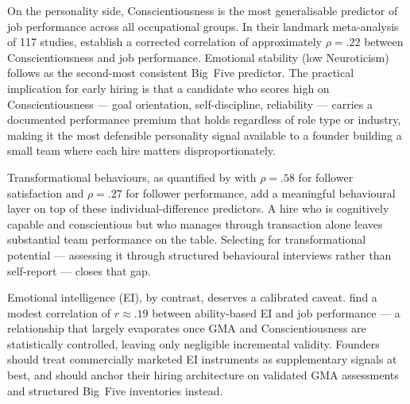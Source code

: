 On the personality side, Conscientiousness is the most generalisable predictor of job
performance across all occupational groups. In their landmark meta-analysis of \num{117}
studies,
\textcite{barrick1991big} establish a corrected correlation of approximately \(\rho = .22\)
between Conscientiousness and job performance. Emotional stability (low Neuroticism) follows as
the second-most consistent Big~Five predictor. The practical implication for early hiring is
that a candidate who scores high on Conscientiousness --- goal orientation, self-discipline,
reliability --- carries a documented performance premium that holds regardless of role type or
industry, making it the most defensible personality signal available to a founder building a
small team where each hire matters disproportionately.

Transformational behaviours, as quantified by \textcite{judge2004transformational} with
\(\rho = .58\) for follower satisfaction and \(\rho = .27\) for follower performance, add a
meaningful behavioural layer on top of these individual-difference predictors. A hire who is
cognitively capable and conscientious but who manages through transaction alone leaves
substantial team performance on the table. Selecting for transformational potential --- assessing
it through structured behavioural interviews rather than self-report --- closes that gap.

Emotional intelligence (EI), by contrast, deserves a calibrated caveat.
\textcite{joseph2010emotional} find a modest correlation of \(r \approx .19\) between
ability-based EI and job performance --- a relationship that largely evaporates once GMA and
Conscientiousness are statistically controlled, leaving only negligible incremental validity.
Founders should treat commercially marketed EI instruments as supplementary signals at best, and
should anchor their hiring architecture on validated GMA assessments and structured Big~Five
inventories instead.

